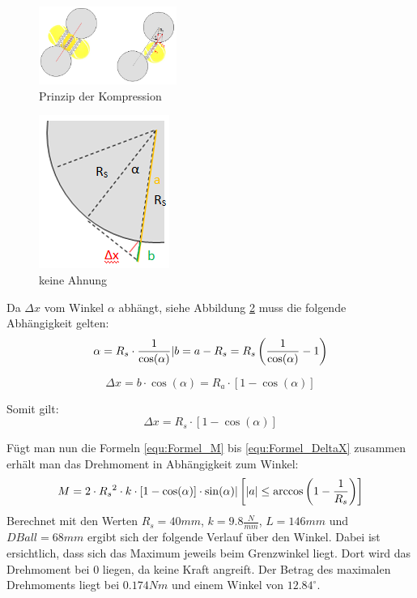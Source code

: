 \begin{figure}[h!]
	\centering
	\includegraphics[width=0.4\textwidth]{Enddokumentation/Anhang/Bilder/PrinzipKompression.png}
	\caption{Prinzip der Kompression}
	\label{fig:PrinzipBallKomp}
\end{figure}

\begin{figure}
    \includegraphics[scale=0.75]{Enddokumentation/Anhang/Bilder/GrafikKreisErkaerung.png}
    \centering
    \caption{keine Ahnung}
    \label{abb:KreisErkaerung}
\end{figure}
Da $\Delta x$ vom Winkel $\alpha$ abhängt, siehe Abbildung \ref{abb:KreisErkaerung} muss die folgende Abhängigkeit gelten:
\begin{equation}  
	\alpha = R_s \cdot \frac{1}{\cos(\alpha)} \\ \lvert \\ b = a - R_s = R_s \left( \frac{1}{\cos(\alpha)}-1\right)   
\end{equation}

\begin{equation}  
	\Delta x = b \cdot \cos(\alpha) = R_a \cdot \left[1 - \cos(\alpha)\right]
\end{equation}

Somit gilt:
\begin{equation}  
	\Delta x =  R_s \cdot \left[1 - \cos(\alpha)\right]
	\label{equ:Formel_DeltaX}
\end{equation}

Fügt man nun die Formeln \ref{equ:Formel_M} bis \ref{equ:Formel_DeltaX} zusammen erhält man das Drehmoment in Abhängigkeit zum Winkel:
\begin{equation}  
    M = 2 \cdot R_s{^{2}} \cdot k \cdot \left[1 - \cos(\alpha)\right] \cdot \sin(\alpha)\\\lvert\\ \left[ |a| \leq \arccos \left(1-\frac{1}{R_s}\right)\right]
\end{equation}
Berechnet mit den Werten $R_s = 40 mm$, $k = 9.8 \frac{N}{mm}$, $L = 146 mm$ und $DBall = 68 mm$ ergibt sich der folgende Verlauf über den Winkel. Dabei ist ersichtlich, dass sich das Maximum jeweils beim Grenzwinkel liegt. Dort wird das Drehmoment bei 0 liegen, da keine Kraft angreift. Der Betrag des maximalen Drehmoments liegt bei $0.174 Nm$ und einem Winkel von $12.84^\circ$.


